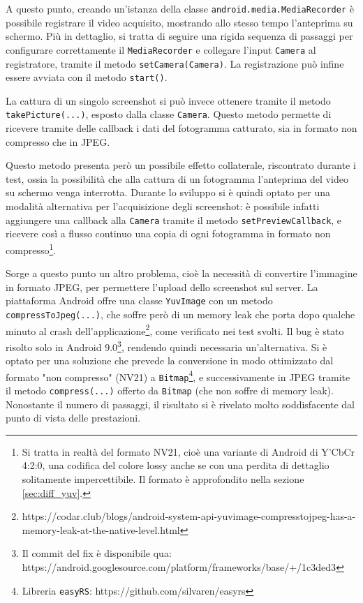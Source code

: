 A questo punto, creando un'istanza della classe \texttt{android.media.MediaRecorder} è possibile registrare il video acquisito, mostrando allo stesso tempo l'anteprima su schermo. Più in dettaglio, si tratta di seguire una rigida sequenza di passaggi\footnotemark{} per configurare correttamente il \texttt{MediaRecorder} e collegare l'input \texttt{Camera} al registratore, tramite il metodo \texttt{setCamera(Camera)}. La registrazione può infine essere avviata con il metodo \texttt{start()}.


La cattura di un singolo screenshot si può invece ottenere tramite il metodo \texttt{takePicture(...)}, esposto dalla classe \texttt{Camera}. Questo metodo permette di ricevere tramite delle callback i dati del fotogramma catturato, sia in formato non compresso che in JPEG.

Questo metodo presenta però un possibile effetto collaterale, riscontrato durante i test, ossia la possibilità che alla cattura di un fotogramma l'anteprima del video su schermo venga interrotta. Durante lo sviluppo si è quindi optato per una modalità alternativa per l'acquisizione degli screenshot: è possibile infatti aggiungere una callback alla \texttt{Camera} tramite il metodo \texttt{setPreviewCallback}, e ricevere così a flusso continuo una copia di ogni fotogramma in formato non compresso\footnote{Si tratta in realtà del formato NV21, cioè una variante di Android di Y'CbCr 4:2:0, una codifica del colore lossy anche se con una perdita di dettaglio solitamente impercettibile. Il formato è approfondito nella sezione \ref{sec:diff_yuv}.}.

Sorge a questo punto un altro problema, cioè la necessità di convertire l'immagine in formato JPEG, per permettere l'upload dello screenshot sul server. La piattaforma Android offre una classe \texttt{YuvImage} con un metodo \texttt{compressToJpeg(...)}, che soffre però di un memory leak che porta dopo qualche minuto al crash dell'applicazione\footnote{https://codar.club/blogs/android-system-api-yuvimage-compresstojpeg-has-a-memory-leak-at-the-native-level.html}, come verificato nei test svolti. Il bug è stato risolto solo in Android 9.0\footnote{Il commit del fix è disponibile qua: https://android.googlesource.com/platform/frameworks/base/+/1c3ded3}, rendendo quindi necessaria un'alternativa. Si è optato per una soluzione che prevede la conversione in modo ottimizzato dal formato "non compresso" (NV21) a \texttt{Bitmap}\footnote{Libreria \texttt{easyRS}: https://github.com/silvaren/easyrs}, e successivamente in JPEG tramite il metodo \texttt{compress(...)} offerto da \texttt{Bitmap} (che non soffre di memory leak). Nonostante il numero di passaggi, il risultato si è rivelato molto soddisfacente dal punto di vista delle prestazioni.

